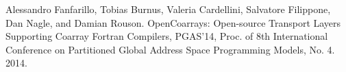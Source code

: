 \documentclass[graybox]{svmult}
\begin{document}
\begin{thebibliography}{99}
Alessandro Fanfarillo, Tobias Burnus, Valeria Cardellini, Salvatore Filippone, 
Dan Nagle, and Damian Rouson. OpenCoarrays: Open-source Transport Layers 
Supporting Coarray Fortran Compilers, PGAS'14, Proc. of 8th International 
Conference on Partitioned Global Address Space Programming Models, No. 4. 2014.





\end{thebibliography}







\end{document}
